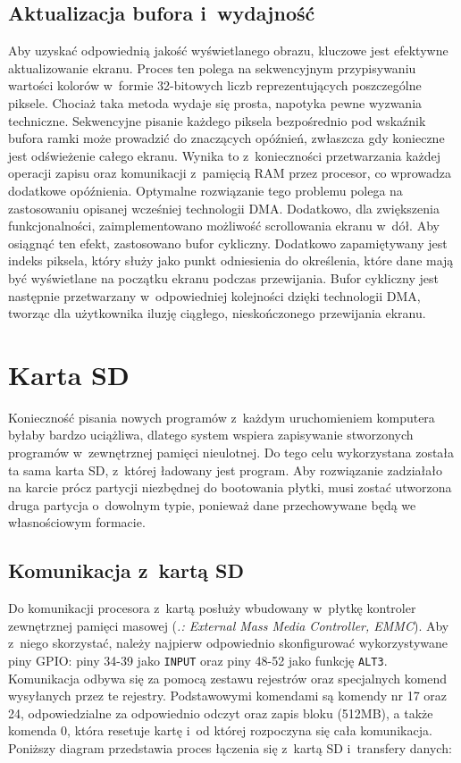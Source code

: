 \documentclass[shortabstract]{iithesis}
\begin{document}
\subsection{Aktualizacja bufora i~wydajność}
Aby uzyskać odpowiednią jakość wyświetlanego obrazu, kluczowe jest efektywne aktualizowanie ekranu. Proces ten polega na sekwencyjnym przypisywaniu wartości kolorów w~formie 32-bitowych liczb reprezentujących poszczególne piksele. Chociaż taka metoda wydaje się prosta, napotyka pewne wyzwania techniczne. Sekwencyjne pisanie każdego piksela bezpośrednio pod wskaźnik bufora ramki może prowadzić do znaczących opóźnień, zwłaszcza gdy konieczne jest odświeżenie całego ekranu. Wynika to z~konieczności przetwarzania każdej operacji zapisu oraz komunikacji z~pamięcią RAM przez procesor, co wprowadza dodatkowe opóźnienia. Optymalne rozwiązanie tego problemu polega na zastosowaniu opisanej wcześniej technologii DMA.
Dodatkowo, dla zwiększenia funkcjonalności, zaimplementowano możliwość scrollowania ekranu w~dół. Aby osiągnąć ten efekt, zastosowano bufor cykliczny. Dodatkowo zapamiętywany jest indeks piksela, który służy jako punkt odniesienia do określenia, które dane mają być wyświetlane na początku ekranu podczas przewijania. Bufor cykliczny jest następnie przetwarzany w~odpowiedniej kolejności dzięki technologii DMA, tworząc dla użytkownika iluzję ciągłego, nieskończonego przewijania ekranu.

\section{Karta SD}
Konieczność pisania nowych programów z~każdym uruchomieniem komputera byłaby bardzo uciążliwa, dlatego system wspiera zapisywanie stworzonych programów w~zewnętrznej pamięci nieulotnej. Do tego celu wykorzystana została ta sama karta SD, z~której ładowany jest program. Aby rozwiązanie zadziałało na karcie prócz partycji niezbędnej do bootowania płytki, musi zostać utworzona druga partycja o~dowolnym typie, ponieważ dane przechowywane będą we własnościowym formacie. 
\subsection{Komunikacja z~kartą SD}
Do komunikacji procesora z~kartą posłuży wbudowany w~płytkę kontroler zewnętrznej pamięci masowej (\textit{.: External Mass Media Controller, EMMC}). Aby z~niego skorzystać, należy najpierw odpowiednio skonfigurować wykorzystywane piny GPIO: piny 34-39 jako \texttt{INPUT} oraz piny 48-52 jako funkcję \texttt{ALT3}. Komunikacja odbywa się za pomocą zestawu rejestrów oraz specjalnych komend wysyłanych przez te rejestry. Podstawowymi komendami są komendy nr 17 oraz 24, odpowiedzialne za odpowiednio odczyt oraz zapis bloku (512MB), a także komenda 0, która resetuje kartę i~od której rozpoczyna się cała komunikacja.
Poniższy diagram przedstawia proces łączenia się z~kartą SD i~transfery danych:
\end{document}
